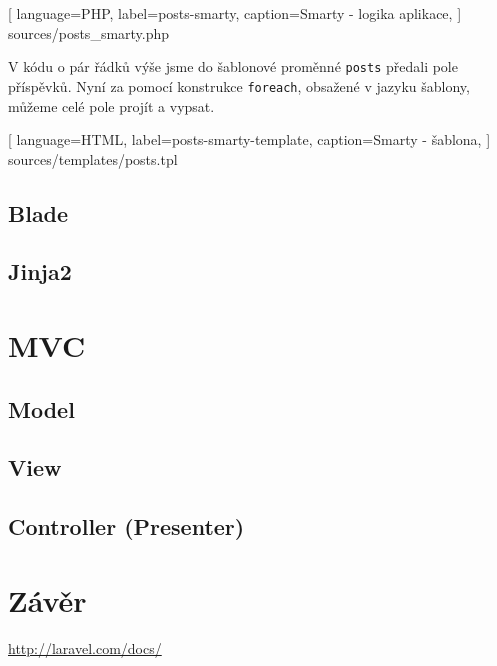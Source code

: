 \documentclass[10pt,a4paper]{article}
\begin{document}
			
			[
				language=PHP,
				label=posts-smarty,
				caption={Smarty - logika aplikace},
			] {sources/posts_smarty.php}

			V kódu o pár řádků výše jsme do šablonové proměnné \texttt{posts} předali pole příspěvků. Nyní za pomocí konstrukce \texttt{foreach}, obsažené v jazyku šablony, můžeme celé pole projít a vypsat.
			
			
			[
				language=HTML,
				label=posts-smarty-template,
				caption={Smarty - šablona},
			] {sources/templates/posts.tpl}
		
		
		\subsection{Blade}

		\subsection{Jinja2}

		
	\section{MVC}

		\subsection{Model}

		\subsection{View}

		\subsection{Controller (Presenter)}


	\section{Závěr}
	
	\newpage
	\begin{thebibliography}{}
		 \url{http://laravel.com/docs/}
	\end{thebibliography}
	
	
\end{document}
